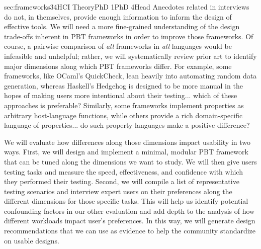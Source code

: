 %
  {sec:frameworks}{3}{4}{HCI Theory}{PhD
1}{PhD 4}{Head}
%
Anecdotes related in interviews do not, in themselves, provide enough
information to inform the design of effective tools.  We will need a more
fine-grained understanding of the design trade-offs inherent in PBT frameworks
in order to improve those frameworks.  
Of course, a pairwise comparison of {\em all} frameworks in {\em all}
languages would be infeasible and
unhelpful; rather, we will systematically review prior art to identify major
dimensions along which PBT frameworks differ. For example, some frameworks, like
OCaml's QuickCheck, lean heavily into automating random data generation, whereas
Haskell's Hedgehog is designed to be more manual in the hopes of
making users more intentional about their testing... which of these approaches is
preferable? Similarly, some frameworks implement properties as arbitrary
host-language functions, while others provide a rich domain-specific language of
properties... do such property languages make a positive difference?

We will evaluate how differences along those dimensions impact usability in
two ways. First, we will design and implement a minimal, modular PBT framework
that can be tuned along the dimensions we want to study.  \iflater{}\fi We will
then give users testing tasks and measure the speed, effectiveness, and
confidence with which they performed their testing.  Second, we will compile a
list of representative testing scenarios and interview expert users on their
preferences along the different dimensions for those specific tasks. This will
help us identify potential confounding factors in our other evaluation and add
depth to the analysis of how different workloads impact user's preferences.  In
this way, we will generate design recommendations that we can use as evidence to
help the community standardize on usable designs.


